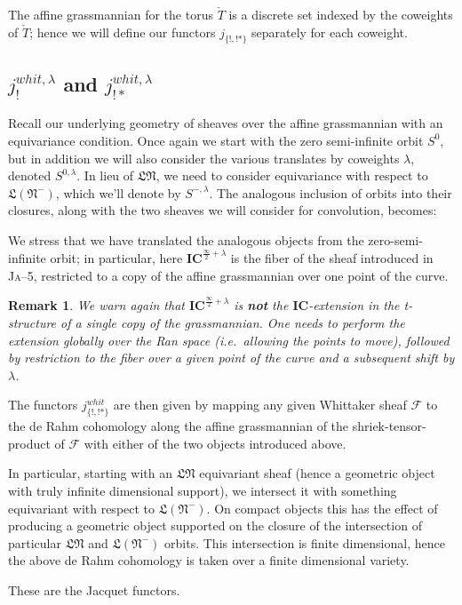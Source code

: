 \documentclass[12pt]{amsart}
\newtheorem{rmk}[thm]{Remark}
\newcommand\Ja[1]{\textsc{Ja}-#1}
\newcommand\LN{\mathfrak{LN}}
\newcommand\LNm{\mathfrak{L}(\mathfrak{N}^-)}
\newcommand\IC{\mathbf{IC}}
\newcommand\Gr{\mathbf{Gr}}
\newcommand\semiinf{\frac{\infty}{2}}
\begin{document}
  The affine grassmannian for the torus $\check{T}$ is a discrete set indexed by
  the coweights of $\check{T}$; hence we will define our functors $j_{\{!,!*\}}$
  separately for each coweight.

  \subsection{$j_!^{whit,\lambda}$ and $j_{!*}^{whit,\lambda}$}
  Recall our underlying geometry of sheaves over the affine grassmannian with an
  equivariance condition. Once again we start with the zero semi-infinite orbit
  $S^0$, but in addition we will also consider the various translates by
  coweights $\lambda$, denoted $S^{0,\lambda}$. In lieu of $\LN$, we need to
  consider equivariance with respect to $\LNm$, which we'll denote by
  $S^{-,\lambda}$.  The analogous inclusion of orbits into their closures, along
  with the two sheaves we will consider for convolution, becomes:


  We stress that we have translated the analogous objects from the zero-semi-infinite
  orbit; in particular, here $\IC^{\semiinf+\lambda}$ is the fiber of the sheaf introduced in
  \Ja-5, restricted to a copy of the affine grassmannian over one point
  of the curve.

  \begin{rmk}
    We warn again that $\IC^{\semiinf+\lambda}$ is \textbf{not} the $\IC$-extension in the t-structure of a
    single copy of the grassmannian. One needs to perform the extension globally
    over the Ran space (i.e.\ allowing the points to move), followed by
    restriction to the fiber over a given point of the curve and a subsequent
    shift by $\lambda$.
  \end{rmk}

  The functors $j^{whit}_{\{!,!*\}}$ are then given by mapping any given
  Whittaker sheaf $\mathcal{F}$ to the de Rahm cohomology along the affine
  grassmannian of the shriek-tensor-product of $\mathcal{F}$ with either of the
  two objects introduced above.


  In particular, starting with an $\LN$ equivariant sheaf (hence a geometric
  object with truly infinite dimensional support), we intersect it with
  something equivariant with respect to $\LNm$. On compact objects this has the
  effect of producing a geometric object supported on the closure of the
  intersection of particular $\LN$ and $\LNm$ orbits. This intersection is
  finite dimensional, hence the above de Rahm cohomology is taken over a finite
  dimensional variety.

  These are the Jacquet functors.
\end{document}
